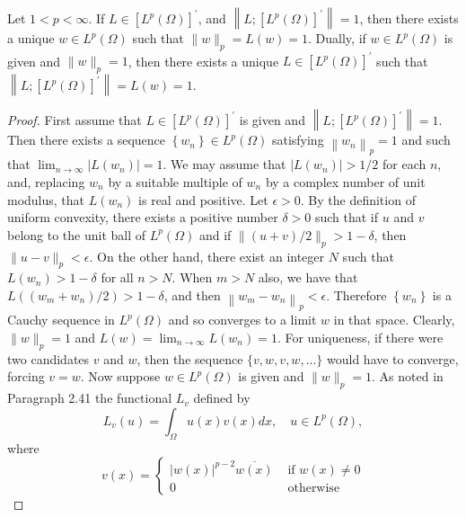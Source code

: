 \begin{lemma}
  Let $1<p<\infty$. If $L \in\left[L^p(\Omega)\right]^{\prime}$, and $\left\|L ;\left[L^p(\Omega)\right]^{\prime}\right\|=1$, then there exists a unique $w \in L^p(\Omega)$ such that $\|w\|_p=L(w)=1$. Dually, if $w \in L^p(\Omega)$ is given and $\|w\|_p=1$, then there exists a unique $L \in\left[L^p(\Omega)\right]^{\prime}$ such that $\left\|L ;\left[L^p(\Omega)\right]^{\prime}\right\|=L(w)=1$.
\end{lemma}

\begin{proof}
  First assume that $L \in\left[L^p(\Omega)\right]^{\prime}$ is given and $\left\|L ;\left[L^p(\Omega)\right]^{\prime}\right\|=1$. Then there exists a sequence $\left\{w_n\right\} \in L^p(\Omega)$ satisfying $\left\|w_n\right\|_p=1$ and such that $\lim _{n \rightarrow \infty}\left|L\left(w_n\right)\right|=1$. We may assume that $\left|L\left(w_n\right)\right|>1 / 2$ for each $n$, and, replacing $w_n$ by a suitable multiple of $w_n$ by a complex number of unit modulus, that $L\left(w_n\right)$ is real and positive. Let $\epsilon>0$. By the definition of uniform convexity, there exists a positive number $\delta>0$ such that if $u$ and $v$ belong to the unit ball of $L^p(\Omega)$ and if $\|(u+v) / 2\|_p>1-\delta$, then $\|u-v\|_p<\epsilon$. On the other hand, there exist an integer $N$ such that $L\left(w_n\right)>1-\delta$ for all $n>N$. When $m>N$ also, we have that $L\left(\left(w_m+w_n\right) / 2\right)>1-\delta$, and then $\left\|w_m-w_n\right\|_p<\epsilon$. Therefore $\left\{w_n\right\}$ is a Cauchy sequence in $L^p(\Omega)$ and so converges to a limit $w$ in that space. Clearly, $\|w\|_p=1$ and $L(w)=\lim _{n \rightarrow \infty} L\left(w_n\right)=1$. For uniqueness, if there were two candidates $v$ and $w$, then the sequence $\{v, w, v, w, \ldots\}$ would have to converge, forcing $v=w$.
  Now suppose $w \in L^p(\Omega)$ is given and $\|w\|_p=1$. As noted in Paragraph 2.41 the functional $L_v$ defined by
  \begin{equation}\label{eq:2.35}
    L_v(u)=\int_{\Omega} u(x) v(x) d x, \quad u \in L^p(\Omega),
  \end{equation}
  where
  \begin{equation}\label{eq:2.36}
    v(x)= \begin{cases}|w(x)|^{p-2} \overline{w(x)} & \text { if } w(x) \neq 0 \\ 0 & \text { otherwise }\end{cases}
  \end{equation}

\end{proof}
